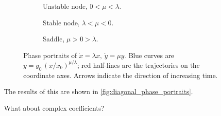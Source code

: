 \begin{example}
\begin{figure}[ht]
    \vspace{1em}

    \begin{subfigure}[t]{0.32\textwidth}
        \centering
        \caption{Unstable node, $0<\mu<\lambda$.}
    \end{subfigure}\hfill
    \begin{subfigure}[t]{0.32\textwidth}
        \centering
        \caption{Stable node, $\lambda<\mu<0$.}
    \end{subfigure}\hfill
    \begin{subfigure}[t]{0.32\textwidth}
        \centering
        \caption{Saddle, $\mu>0>\lambda$.}
    \end{subfigure}

    \caption{Phase portraits of $\dot{x}=\lambda x,\ \dot{y}=\mu y$. Blue curves are
    $y=y_0\,(x/x_0)^{\mu/\lambda}$; red half-lines are the trajectories on the
    coordinate axes. Arrows indicate the direction of increasing time.}
    \label{fig:diagonal_phase_portraits}
\end{figure}
The results of this are shown in \autoref{fig:diagonal_phase_portraits}. 
\end{example}

What about complex coefficients?

